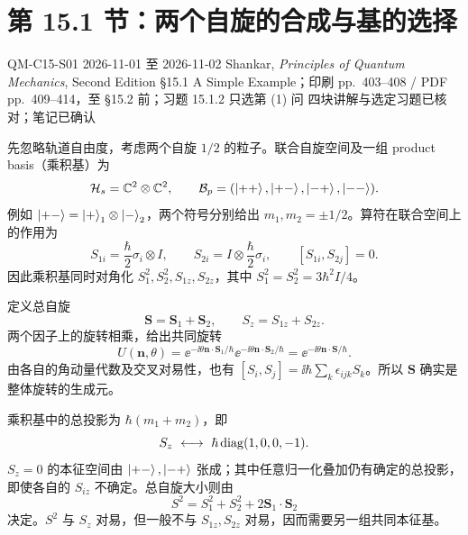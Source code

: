 
\section{第 15.1 节：两个自旋的合成与基的选择}
\label{section:QM-C15-S01}
\studymeta
  {QM-C15-S01}
  {2026-11-01 至 2026-11-02}
  {Shankar, \textit{Principles of Quantum Mechanics}, Second Edition}
  {\S 15.1 A Simple Example；印刷 pp.~403--408 / PDF pp.~409--414，至 \S 15.2 前；习题 15.1.2 只选第 (1) 问}
  {四块讲解与选定习题已核对；笔记已确认}


先忽略轨道自由度，考虑两个自旋 $1/2$ 的粒子。联合自旋空间及一组 product basis（乘积基）为
\begin{equation}
  \mathcal H_s=\mathbb{C}^2\otimes\mathbb{C}^2,\qquad
  \mathcal B_p=(\left|++\right\rangle,\left|+-\right\rangle,\left|-+\right\rangle,\left|--\right\rangle).
\end{equation}
例如 $\left|+-\right\rangle=\left|+\right\rangle_1\otimes\left|-\right\rangle_2$，两个符号分别给出 $m_1,m_2=\pm1/2$。算符在联合空间上的作用为
\begin{equation}
  S_{1i}=\frac\hbar2\sigma_i\otimes I,\qquad
  S_{2i}=I\otimes\frac\hbar2\sigma_i,\qquad
  [S_{1i},S_{2j}]=0.
\end{equation}
因此乘积基同时对角化 $S_1^2,S_2^2,S_{1z},S_{2z}$，其中 $S_1^2=S_2^2=3\hbar^2I/4$。

定义总自旋
\begin{equation}
  \boxed{\mathbf S=\mathbf S_1+\mathbf S_2,\qquad S_z=S_{1z}+S_{2z}.}
\end{equation}
两个因子上的旋转相乘，给出共同旋转
\begin{equation}
  U(\mathbf n,\theta)
  =\ee^{-\ii\theta\mathbf n\cdot\mathbf S_1/\hbar}
   \ee^{-\ii\theta\mathbf n\cdot\mathbf S_2/\hbar}
  =\ee^{-\ii\theta\mathbf n\cdot\mathbf S/\hbar}.
\end{equation}
由各自的角动量代数及交叉对易性，也有 $[S_i,S_j]=\ii\hbar\sum_k\epsilon_{ijk}S_k$。所以 $\mathbf S$ 确实是整体旋转的生成元。

乘积基中的总投影为 $\hbar(m_1+m_2)$，即
\begin{equation}
  S_z\ \longleftrightarrow\ \hbar\diag(1,0,0,-1).
\end{equation}
$S_z=0$ 的本征空间由 $\left|+-\right\rangle,\left|-+\right\rangle$ 张成；其中任意归一化叠加仍有确定的总投影，即使各自的 $S_{iz}$ 不确定。总自旋大小则由
\begin{equation}
  \boxed{S^2=S_1^2+S_2^2+2\mathbf S_1\cdot\mathbf S_2}
\end{equation}
决定。$S^2$ 与 $S_z$ 对易，但一般不与 $S_{1z},S_{2z}$ 对易，因而需要另一组共同本征基。

